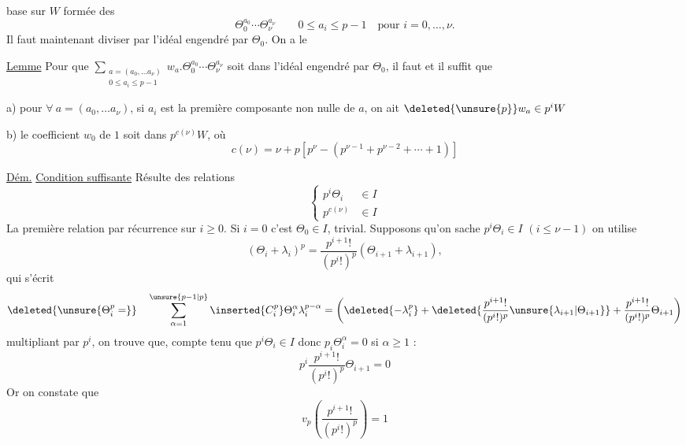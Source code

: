 base sur $W$ formée des
\[
\Theta_0^{a_0}\cdots\Theta_\nu^{a_\nu}\qquad 0\leq a_i\leq p-1\quad\text{pour }i=0,\ldots,\nu.
\]
Il faut maintenant diviser par l'idéal  engendré par $\Theta_0$. On a le

\uline{Lemme} Pour que $\displaystyle\sum_{\substack{a=(a_0,\ldots a_\nu)\\0\leq a_i\leq p-1}}w_a.\Theta_0^{a_0}\cdots\Theta_\nu^{a_\nu}$ soit dans l'idéal engendré par $\Theta_0$, il faut et il suffit que

a) pour $\forall\ a=(a_0,\ldots a_\nu)$, si  $a_i$ est la première composante non nulle de $a$, on ait $\deleted{\unsure{p}}w_a\in p^iW$

b) le coefficient $w_0$ de $1$ soit dans $p^{c(\nu)}W$, où
\[
c(\nu)=\nu+p[p^\nu-(p^{\nu-1}+p^{\nu-2}+\cdots+1)]
\]

\uline{Dém.} \uline{Condition suffisante} Résulte des relations
\[
\left\{\begin{aligned}p^i\Theta_i&\in I\\p^{c(\nu)}&\in I\end{aligned}\right.
\]
La première relation par récurrence sur $i\geq0$. Si $i=0$ c'est $\Theta_0\in I$,  trivial. Supposons qu'on sache $p^i\Theta_i\in I$ $(i\leq\nu-1)$ on utilise
\[
(\Theta_i+\lambda_i)^p=\frac{p^{i+1}!}{(p^i!)^p}(\Theta_{i+1}+\lambda_{i+1}),
\]
qui s'écrit
\[
\deleted{\unsure{\Theta_i^p=}}\quad\sum_{\alpha=1}^{\unsure{p-1|p}}\inserted{C_i^p}\Theta_i^\alpha\lambda_i^{p-\alpha}
=\left(\deleted{-\lambda_i^p}+\deleted{\frac{p^{i+1}!}{(p^i!)^p}\unsure{\lambda_{i+1}|\Theta_{i+1}}}+\frac{p^{i+1}!}{(p^i!)^p}\Theta_{i+1}\right)
\]
multipliant par $p^i$, on trouve que, compte tenu que $p^i\Theta_i\in I$ donc $p_i\Theta_i^\alpha=0$ si $\alpha\geq1$ :
\[
p^i\frac{p^{i+1}!}{(p^i!)^p}\Theta_{i+1}=0
\]
Or on constate que
\[
v_p\left(\frac{p^{i+1}!}{(p^i!)^p}\right)=1
\]
